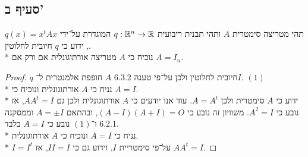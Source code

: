 \subsection{סעיף ב'}
תהי מטריצה סימטרית $A$ ותהי תבנית ריבועית $q : \mathbb{R}^n \to \mathbb{R}$ המוגדרת על־ידי $q(x) = x^t A x$, ידוע כי $q$ חיובית לחלוטין. \\*
נוכיח כי $A$ מטריצה אורתוגונלית אם ורק אם $A = I_n$.
\begin{proof}
	$q$ חיובית לחלוטין ולכן על־פי טענה 6.3.2 $A$ חופפת אלמנטרית ל־$I$. $(1)$ \\*
	נניח כי $A$ אורתוגונלית ונוכיח כי $A = I$. \\*
	ידוע כי $A$ סימטרית ולכן $A = A^t$. עוד אנו יודעים כי $A$ אורתוגונלית ולכן גם $A A^t = I$, אז נובע כי $A^2 = I$.
	משוויון זה נובע כי $(A - I)(A + I) = O$, ובהתאם $A = \pm I$ וממסקנה 6.2.1 ו־$(1)$ נובע כי $A = I$ בלבד. \\*
	נניח כי $A = I$ ונוכיח כי $A$ אורתוגונלית. \\*
	$I = I^t$ על־פי סימטריית $I$, וידוע גם כי $II = I$, אז $A A^t = I$.
\end{proof}


